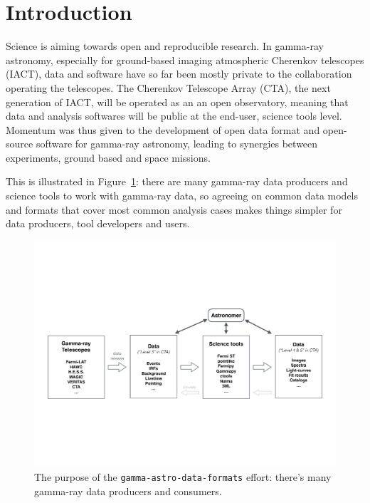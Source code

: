 \section{Introduction}

Science is aiming towards open and reproducible research. In gamma-ray astronomy, especially for ground-based imaging atmospheric Cherenkov telescopes (IACT), data and software have so far been mostly private to the collaboration operating the telescopes. The Cherenkov Telescope Array (CTA), the next generation of IACT, will be operated as an an open observatory, meaning that data and analysis softwares will be public at the end-user, science tools level. Momentum was thus given to the development of open data format and open-source software for gamma-ray astronomy, leading to synergies between experiments, ground based and space missions.

This is illustrated in Figure~\ref{fig:purpose}: there are many gamma-ray data producers and science tools to work with gamma-ray data, so agreeing on common data models and formats that cover most common analysis cases makes things simpler for data producers, tool developers and users.

\begin{figure}[tb]
  \centerline{\includegraphics[width=\textwidth]{figures/purpose}}
  \caption{The purpose of the \texttt{gamma-astro-data-formats} effort: there's
  many gamma-ray data producers and consumers.}
  \label{fig:purpose}
\end{figure}

